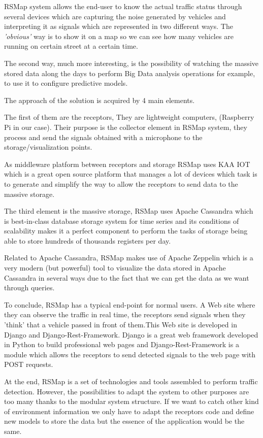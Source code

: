 {{\bigskip

RSMap system allows the end-user to know the actual traffic status through several devices which are capturing the noise generated  by vehicles and interpreting it as signals which are represented in two different ways.
The \textit{'obvious'} way is to show it on a map so we can see how many vehicles are running on certain street at a certain time.

The second way, much more interesting, is the possibility of watching the massive stored data along the days to perform Big Data analysis operations for example, to use it to configure predictive models.

\bigskip
The approach of the solution is acquired by 4 main elements.

The first of them are the receptors, They are lightweight computers, (Raspberry Pi in our case). Their purpose is the collector element in RSMap system, they process and send the signals obtained with a microphone to the storage/visualization points.

As middleware platform between receptors and storage RSMap uses KAA IOT which is a great open source platform that manages a lot of devices which task is to generate and simplify the way to allow the receptors to send data to the massive storage.

The third element is the massive storage, RSMap uses Apache Cassandra which is best-in-class database storage system for time series and its conditions of scalability makes it a perfect component to perform the tasks of storage being able to store hundreds of thousands registers per day.

Related to Apache Cassandra, RSMap makes use of Apache Zeppelin which is a very modern (but powerful) tool to visualize the data stored in Apache Cassandra in several ways due to the fact that we can get the data as we want through queries.

To conclude, RSMap has a typical end-point for normal users. A Web site where they can observe the traffic in real time, the receptors send signals when they 'think' that a vehicle passed in front of them.This Web site is developed in Django and Django-Rest-Framework. Django is a great web framework developed in Python to build professional web pages and Django-Rest-Framework is a module which allows the receptors to send detected signals to the web page with POST requests.


\bigskip
At the end, RSMap is a set of technologies and tools assembled to perform traffic detection. However, the possibilities to adapt the system to other purposes are too many thanks to the modular system structure. If we want to catch other kind of environment information we only have to adapt the receptors code and define new models to store the data but the essence of the application would be the same.

}}
